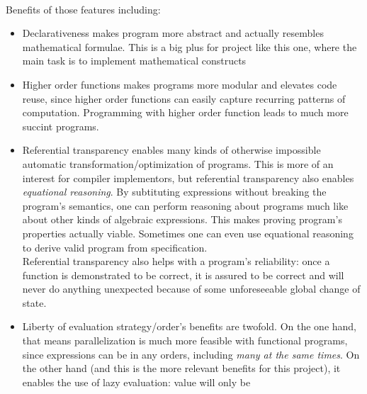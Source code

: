 \documentclass[../gr-final.tex]{subfiles}
\begin{document}
\paragraph {}Benefits of those features including:
\begin{itemize}
        \item {Declarativeness} makes program more abstract and actually
          resembles mathematical formulae. This is a big plus for
          project like this one, where the main task is to
          implement mathematical constructs    
        \item {Higher order functions} makes
                programs more modular and elevates code reuse,
                since higher order functions can easily capture
                recurring patterns of computation. Programming
                with higher order function leads to much more
                succint programs.
        \item {Referential transparency} enables many kinds of
                otherwise impossible automatic
                transformation/optimization of programs. This is
                more of an interest for compiler implementors,
                but referential transparency also enables 
                {\it equational reasoning}. By
                subtituting expressions without breaking the
                program's semantics, one can perform reasoning
                about programs much like about other kinds of
                algebraic expressions. This makes proving
                program's properties actually viable. Sometimes
                one can even use equational reasoning to derive
                valid program from specification.\\
                Referential transparency also helps with a
                program's reliability: once a function is
                demonstrated to be correct, it is assured to be correct and
                will never do anything unexpected because of some
                unforeseeable global change of state.                
        \item Liberty of evaluation strategy/order's benefits are
                twofold. On the one hand, that means
                parallelization is much more feasible with
                functional programs, since expressions can be
                in any orders, including {\it many at the same
                times}. On the other hand (and this is the more
                relevant benefits for this project), it enables
                the use of lazy evaluation: value will only be

\end{itemize}
\end{document}
